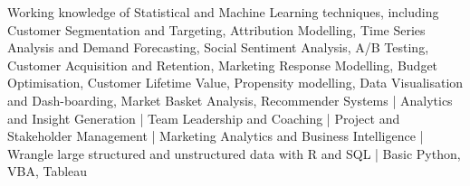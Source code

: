 

\begin{cvparagraph}

Working knowledge of Statistical and Machine Learning techniques, including Customer Segmentation and Targeting, Attribution Modelling, Time Series Analysis and Demand Forecasting, Social Sentiment Analysis, A/B Testing, Customer Acquisition and Retention, Marketing Response Modelling, Budget Optimisation, Customer Lifetime Value, Propensity modelling, Data Visualisation and Dash-boarding, Market Basket Analysis, Recommender Systems | Analytics and Insight Generation | Team Leadership and Coaching | Project and Stakeholder Management | Marketing Analytics and Business Intelligence | Wrangle large structured and unstructured data with R and SQL | Basic Python, VBA, Tableau
\end{cvparagraph}
